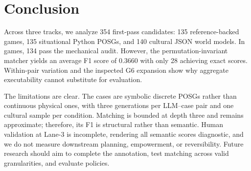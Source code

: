 \documentclass{article}
\begin{document}
\section{Conclusion}
\label{sec:conclusion}

Across three tracks, we analyze 354 first-pass candidates: 135 reference-backed games, 135 situational Python POSGs, and 140 cultural JSON world models. In games, 134 pass the mechanical audit. However, the permutation-invariant matcher yields an average F1 score of 0.3660 with only 28 achieving exact scores. Within-pair variation and the inspected G6 expansion show why aggregate executability cannot substitute for evaluation. %

The limitations are clear. The cases are symbolic discrete POSGs rather than continuous physical ones, with three generations per LLM–case pair and one cultural sample per condition. Matching is bounded at depth three and remains approximate; therefore, its F1 is structural rather than semantic. Human validation at Lane-3 is incomplete, rendering all semantic scores diagnostic, and we do not measure downstream planning, empowerment, or reversibility. Future research should aim to complete the annotation, test matching across valid granularities, and evaluate policies.

 
\medskip

{
\small

}


\end{document}
